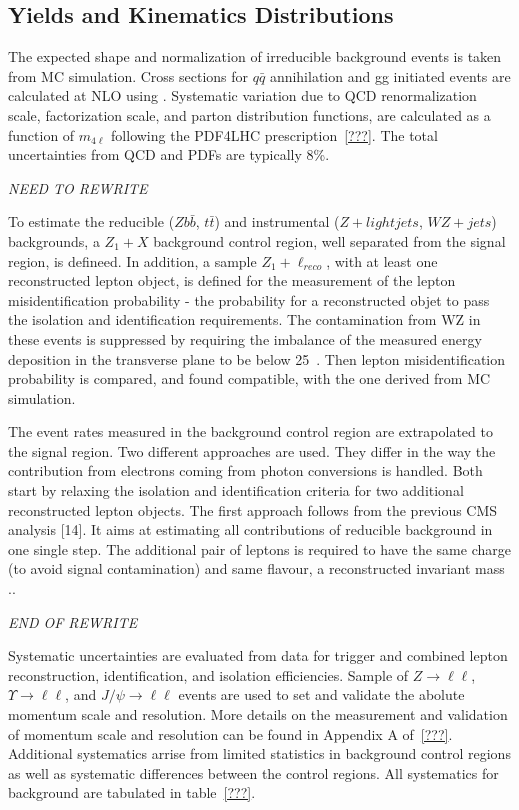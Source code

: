 \subsection{Yields and Kinematics Distributions}
\label{sec:HZZ4lyields}

The expected shape and normalization of irreducible 
background events is taken from MC simulation.  Cross sections
for $q\bar{q}$ annihilation and gg initiated events are 
calculated at NLO using \MCFM.  Systematic variation due to 
QCD renormalization scale, factorization scale, and parton 
distribution functions, are calculated as a function of $m_{4\ell}$
following the PDF4LHC prescription~\ref{???}. The total 
uncertainties from QCD and PDFs are typically 8\%.  

{\it NEED TO REWRITE}

To estimate the reducible ($Zb\bar{b}$, $t\bar{t}$) and 
instrumental ($Z+light jets$, $WZ+jets$) backgrounds, a 
$Z_1+X$ background control region, well separated from the 
signal region, is defineed.  In addition, a sample $Z_1+\ell_{reco}$,
with at least one reconstructed lepton object, is defined for the
measurement of the lepton misidentification probability - the
probability for a reconstructed objet to pass the isolation and 
identification requirements.  The contamination from WZ in these
events is suppressed by requiring the imbalance of the measured
energy deposition in the transverse plane to be below 25~\GeV. 
Then lepton misidentification probability is compared, and found
compatible, with the one derived from MC simulation.

The event rates measured in the background control region are
extrapolated to the signal region.  Two different approaches are
used.  They differ in the way the contribution from electrons
coming from photon conversions is handled.  Both start by 
relaxing the isolation and identification criteria for two 
additional reconstructed lepton objects.  The first approach 
follows from the previous CMS analysis [14].  It aims at
estimating all contributions of reducible background in one 
single step.  The additional pair of leptons is required to have
the same charge (to avoid signal contamination) and same flavour,
a reconstructed invariant mass .. 

{\it END OF REWRITE}

Systematic uncertainties are evaluated from data for trigger 
and combined lepton reconstruction, identification, and
isolation efficiencies.  Sample of $Z\to\ell\ell$, 
$\Upsilon\to\ell\ell$, and $J/\psi\to\ell\ell$ events are used
to set and validate the abolute momentum scale and resolution.  
More details on the measurement and validation of momentum 
scale and resolution can be found in Appendix A of~\ref{???}.
Additional systematics arrise from limited statistics in 
background control regions as well as systematic differences 
between the control regions.  All systematics for background
are tabulated in table~\ref{???}.

